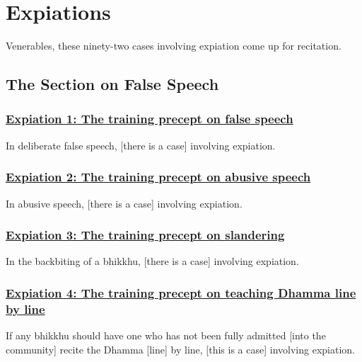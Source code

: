 
\section{Expiations}
\label{exp}

\begin{intro}
	Venerables, these ninety-two cases involving expiation come up for recitation.
\end{intro}

\setsubsecheadstyle{\subsectionFmt}
\subsection{The Section on False Speech}

\subsubsection*{\hyperref[pac1]{Expiation 1: The training precept on false speech}}
\label{exp1}

In deliberate false speech, [there is a case] involving expiation.



\subsubsection*{\hyperref[pac2]{Expiation 2: The training precept on abusive speech}}
\label{exp2}

In abusive speech, [there is a case] involving expiation.



\subsubsection*{\hyperref[pac3]{Expiation 3: The training precept on slandering}}
\label{exp3}

In the backbiting of a bhikkhu, [there is a case] involving expiation.



\subsubsection*{\hyperref[pac4]{Expiation 4: The training precept on teaching Dhamma line by line}}
\label{exp4}

If any bhikkhu should have one who has not been fully admitted [into the community] recite the Dhamma [line] by line, [this is a case] involving expiation.



